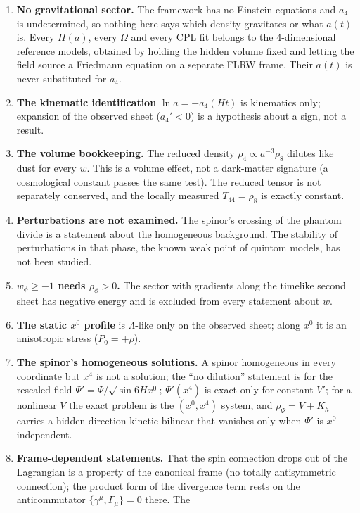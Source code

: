 \documentclass[11pt,a4paper]{article}
\begin{document}
\begin{enumerate}[label=\arabic*.]
\item \textbf{No gravitational sector.} The framework has no Einstein equations and $a_4$ is
  undetermined, so nothing here says which density gravitates or what $a(t)$ is. Every $H(a)$,
  every $\Omega$ and every CPL fit belongs to the 4-dimensional reference models, obtained by
  holding the hidden volume fixed and letting the field source a Friedmann equation on a separate
  FLRW frame. Their $a(t)$ is never substituted for $a_4$.
\item \textbf{The kinematic identification} $\ln a=-a_4(Ht)$ is kinematics only; expansion of the
  observed sheet ($a_4'<0$) is a hypothesis about a sign, not a result.
\item \textbf{The volume bookkeeping.} The reduced density $\rho_4\propto a^{-3}\rho_8$ dilutes
  like dust for every $w$. This is a volume effect, not a dark-matter signature (a cosmological
  constant passes the same test). The reduced tensor is not separately conserved, and the locally
  measured $T_{44}=\rho_8$ is exactly constant.
\item \textbf{Perturbations are not examined.} The spinor's crossing of the phantom divide is a
  statement about the homogeneous background. The stability of perturbations in that phase, the
  known weak point of quintom models, has not been studied.
\item \textbf{$w_\phi\ge-1$ needs $\rho_\phi>0$.} The sector with gradients along the timelike
  second sheet has negative energy and is excluded from every statement about $w$.
\item \textbf{The static $x^0$ profile} is $\Lambda$-like only on the observed sheet; along $x^0$
  it is an anisotropic stress ($P_0=+\rho$).
\item \textbf{The spinor's homogeneous solutions.} A spinor homogeneous in every coordinate but
  $x^4$ is not a solution; the ``no dilution'' statement is for the rescaled field
  $\Psi'=\Psi/\sqrt{\sin 6Hx^0}$; $\Psi'(x^4)$ is exact only for constant $V'$; for a nonlinear $V$
  the exact problem is the $(x^0,x^4)$ system, and $\rho_\Psi=V+K_h$ carries a hidden-direction
  kinetic bilinear that vanishes only when $\Psi'$ is $x^0$-independent.
\item \textbf{Frame-dependent statements.} That the spin connection drops out of the Lagrangian is
  a property of the canonical frame (no totally antisymmetric connection); the product form of the
  divergence term rests on the anticommutator $\{\gamma^\mu,\Gamma_\mu\}=0$ there. The

\end{enumerate}
\end{document}
